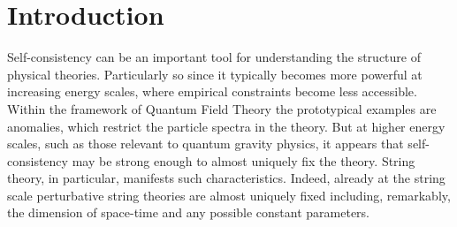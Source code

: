 \documentclass[11pt,a4paper]{article}
\numberwithin{equation}{section}
\numberwithin{table}{section}\setlength{\multlinegap}{25pt}
\begin{document}
\setcounter{page}{1}


\newpage

\tableofcontents

\section{Introduction}
\label{sec:intro}

Self-consistency can be an important tool for understanding the structure of physical theories. Particularly so since it typically becomes more powerful at increasing energy scales, where empirical constraints become less accessible. Within the framework of Quantum Field Theory the prototypical examples are anomalies, which restrict the particle spectra in the theory. But at higher energy scales, such as those relevant to quantum gravity physics, it appears that self-consistency may be strong enough to almost uniquely fix the theory. String theory, in particular, manifests such characteristics. Indeed, already at the string scale perturbative string theories are almost uniquely fixed including, remarkably, the dimension of space-time and any possible constant parameters. 
\end{document}
